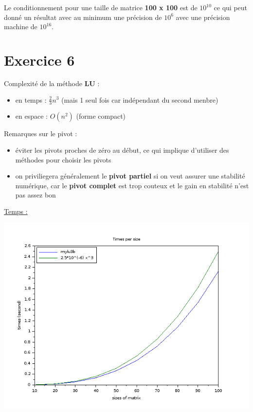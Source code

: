 \documentclass[12pt, letterpaper]{article}
\begin{document}
Le conditionnement pour une taille de matrice \textbf{100 x 100} est
de $10^{10}$ ce qui peut donné un résultat avec au minimum une
précision de $10^{6}$ avec une précision machine de $10^{16}$.\newline

\section*{Exercice 6}

Complexité de la méthode \textbf{LU} :

\begin{itemize}
\item en temps  : $\frac{2}{3} n^3$ (mais 1 seul fois car indépendant
  du second menbre)
\item en espace : $O(n^2)$ (forme compact)
\end{itemize}

Remarques sur le pivot :

\begin{itemize}
\item éviter les pivots proches de zéro au début, ce qui implique
  d'utiliser des méthodes pour choisir les pivots
\item on priviliegera généralement le \textbf{pivot partiel} si on
  veut assurer une stabilité numérique, car le \textbf{pivot complet}
  est trop couteux et le gain en stabilité n'est pas assez bon
\end{itemize}

\underline{Temps :}

\includegraphics[scale=0.5]{img/mylu_times.png}
\end{document}

